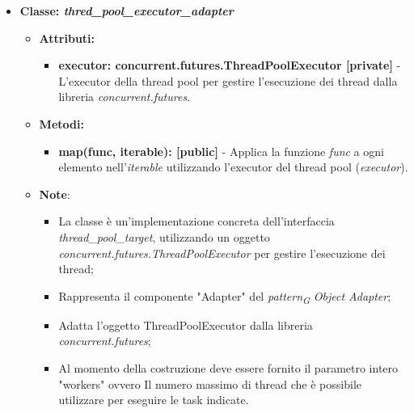\begin{itemize}
    \item{\textbf{Classe: \textit{thred\_pool\_executor\_adapter}}}
    \begin{itemize}
        \item\textbf{Attributi:}
        \begin{itemize}
            \item \textbf{executor: concurrent.futures.ThreadPoolExecutor [private]} - L'executor della thread pool per gestire l'esecuzione dei thread dalla libreria \textit{concurrent.futures}. 
        \end{itemize}
        \item \textbf{Metodi:}
        \begin{itemize}
            \item \textbf{map(func, iterable): [public]} - Applica la funzione \textit{func} a ogni elemento nell'\textit{iterable} utilizzando l'executor del thread pool (\textit{executor}).
        \end{itemize}
        \item\textbf{Note}:
        \begin{itemize}
            \item La classe è un'implementazione concreta dell'interfaccia \textit{thread\_pool\_target}, utilizzando un oggetto \textit{concurrent.futures.ThreadPoolExecutor} per gestire l'esecuzione dei thread;
            \item Rappresenta il componente "Adapter" del \textit{pattern}\textsubscript{\textit{G}} \textit{Object Adapter};
            \item Adatta l'oggetto ThreadPoolExecutor dalla libreria \textit{concurrent.futures};
            \item Al momento della costruzione deve essere fornito il parametro intero "workers" ovvero
            Il numero massimo di thread che è possibile utilizzare per eseguire le task indicate.
        \end{itemize}
    \end{itemize}
\end{itemize}

